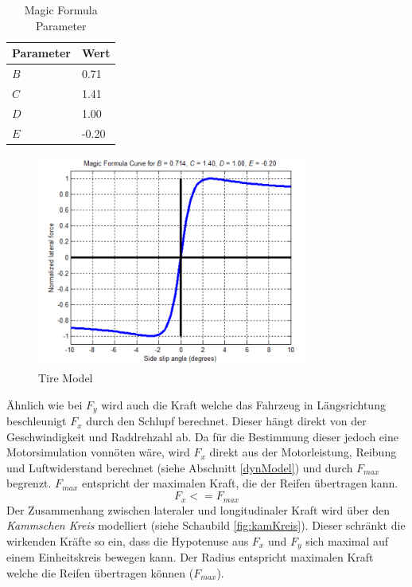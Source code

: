 \documentclass{like}
\begin{document}
\begin{table}[]
	\centering
	\begin{tabular}{l|l}
		\hline
		Parameter	& Wert \\ \hline
		\(B\)	&  0.71 \\
		\(C\)	&  1.41 \\
		\(D\)	&  1.00 \\
		\(E\)	& -0.20 \\

	\end{tabular}
	\caption{Magic Formula Parameter}
	\label{tireParam}
\end{table}

\begin{figure}[ht!]
	\centering
	\includegraphics[width=250pt]{Abbildungen/pacejka.png}
	\caption{Tire Model}
	\label{fig:pacejka}
\end{figure}

Ähnlich wie bei \(F_y\) wird auch die Kraft welche das Fahrzeug in Längsrichtung beschleunigt \(F_x\) durch den Schlupf berechnet. Dieser hängt direkt von der Geschwindigkeit und Raddrehzahl ab. 
Da für die Bestimmung dieser jedoch eine Motorsimulation vonnöten wäre, wird \(F_x\) direkt aus der Motorleistung, Reibung und Luftwiderstand berechnet (siehe Abschnitt \ref{dynModel}) und durch \(F_{max}\) begrenzt. \(F_{max}\) entspricht der maximalen Kraft, die der Reifen übertragen kann.\\
\begin{equation}
F_x <= F_{max}
\end{equation}
Der Zusammenhang zwischen lateraler und longitudinaler Kraft wird über den \textit{Kammschen Kreis} modelliert (siehe Schaubild \ref{fig:kamKreis}). Dieser schränkt die wirkenden Kräfte so ein, dass die Hypotenuse aus \(F_x\) und \(F_y\) sich maximal auf einem Einheitskreis bewegen kann. Der Radius entspricht maximalen Kraft welche die Reifen übertragen können (\(F_{max}\)).
\end{document}
